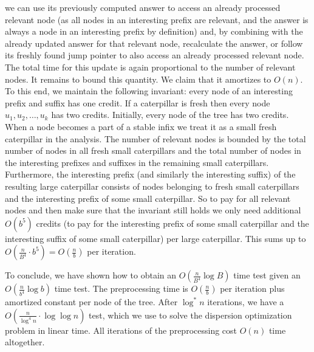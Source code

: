 \documentclass[11pt,a4paper]{article}
\theoremstyle{definition}
\theoremstyle{remark}
\begin{document}
we can use its previously computed answer to access an already processed relevant node
(as all nodes in an interesting prefix are relevant, and the answer is always a node in an
interesting prefix by definition) and, by combining with the already updated answer for that
relevant node, recalculate the answer, or follow its freshly found jump pointer to also access
an already processed relevant node. The total time for this update is again proportional to the
number of relevant nodes. It remains to bound this quantity. We claim that it
amortizes to $O(n)$. To this end, we maintain the following invariant: every node
of an interesting prefix and suffix has one credit. If a caterpillar is fresh
then every node $u_{1},u_{2},\ldots,u_{k}$ has two credits. Initially, every node of the tree
has two credits. When a node becomes a part of a stable infix we treat it as a small fresh
caterpillar in the analysis. The number of relevant nodes is bounded by the total number
of nodes in all fresh small caterpillars and the total number of nodes in the interesting
prefixes and suffixes in the remaining small caterpillars. Furthermore,
the interesting prefix (and similarly the interesting suffix) of the resulting large caterpillar
consists of nodes belonging to fresh small caterpillars and the interesting prefix of
some small caterpillar. So to pay for all relevant nodes and then make sure that the invariant
still holds we only need additional $O(b^{5})$ credits (to pay for the interesting prefix
of some small caterpillar and the interesting suffix of some small caterpillar) per large
caterpillar. This sums up to $O(\frac{n}{B^{4}}\cdot b^{5}) = O(\frac{n}{b})$ per iteration.

To conclude, we have shown how to obtain an $O(\frac{n}{B^{4}}\log B)$ time test given an $O(\frac{n}{b^{4}}\log b)$
time test. The preprocessing time is $O(\frac{n}{b})$ per iteration plus amortized constant per
node of the tree. After $\log ^*n$ iterations, we have a $O(\frac{n}{\log ^4n} \cdot \log \log n)$ test,
which we use to solve the dispersion optimization problem in linear time. All iterations of the preprocessing
cost $O(n)$ time altogether.
\end{document}
